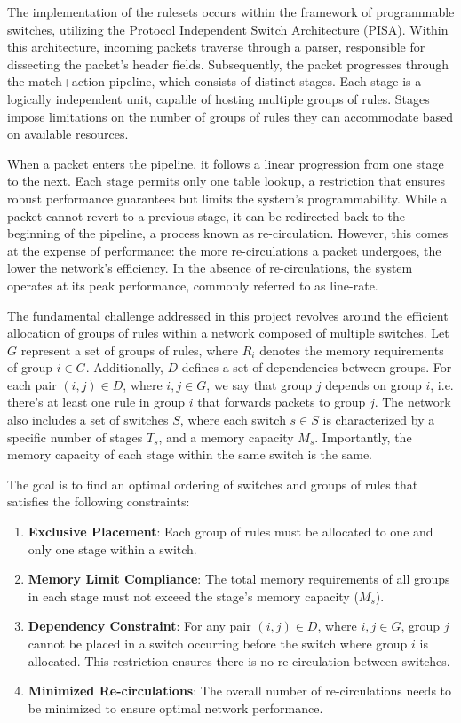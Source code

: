 The implementation of the rulesets occurs within the framework of programmable switches, utilizing the Protocol Independent Switch Architecture (PISA). Within this architecture, incoming packets traverse through a parser, responsible for dissecting the packet's header fields. Subsequently, the packet progresses through the match+action pipeline, which consists of distinct stages. Each stage is a logically independent unit, capable of hosting multiple groups of rules. Stages impose limitations on the number of groups of rules they can accommodate based on available resources.

When a packet enters the pipeline, it follows a linear progression from one stage to the next. Each stage permits only one table lookup, a restriction that ensures robust performance guarantees but limits the system's programmability. While a packet cannot revert to a previous stage, it can be redirected back to the beginning of the pipeline, a process known as re-circulation. However, this comes at the expense of performance: the more re-circulations a packet undergoes, the lower the network's efficiency. In the absence of re-circulations, the system operates at its peak performance, commonly referred to as line-rate.

The fundamental challenge addressed in this project revolves around the efficient allocation of groups of rules within a network composed of multiple switches. Let \(G\) represent a set of groups of rules, where \(R_i\) denotes the memory requirements of group \(i \in G\). Additionally, \(D\) defines a set of dependencies between groups. For each pair \((i, j) \in D\), where \(i, j \in G\), we say that group \(j\) depends on group \(i\), i.e. there's at least one rule in group \(i\) that forwards packets to group \(j\). The network also includes a set of switches \(S\), where each switch \(s \in S\) is characterized by a specific number of stages \(T_s\), and a memory capacity \(M_s\). Importantly, the memory capacity of each stage within the same switch is the same.

The goal is to find an optimal ordering of switches and groups of rules that satisfies the following constraints:

\begin{enumerate}
    \item \textbf{Exclusive Placement}: Each group of rules must be allocated to one and only one stage within a switch.
    
    \item \textbf{Memory Limit Compliance}: The total memory requirements of all groups in each stage must not exceed the stage's memory capacity (\(M_s\)).
    
    \item \textbf{Dependency Constraint}: For any pair \((i, j) \in D\), where \(i, j \in G\), group \(j\) cannot be placed in a switch occurring before the switch where group \(i\) is allocated. This restriction ensures there is no re-circulation between switches.
    
    \item \textbf{Minimized Re-circulations}: The overall number of re-circulations needs to be minimized to ensure optimal network performance.
\end{enumerate}